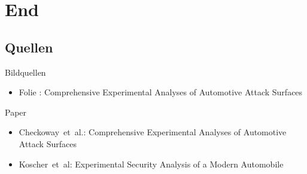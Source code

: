 \section*{End}
\subsection{Quellen}
\begin{frame}{Bildquellen}
    \begin{itemize}
        \item Folie : Comprehensive Experimental Analyses of Automotive Attack Surfaces
    \end{itemize}
\end{frame}

\begin{frame}{Paper}
    \begin{itemize}
        \item Checkoway~et~al.: Comprehensive Experimental Analyses of Automotive Attack Surfaces
        \item Koscher~et~al: Experimental Security Analysis of a Modern Automobile
    \end{itemize}
\end{frame}

